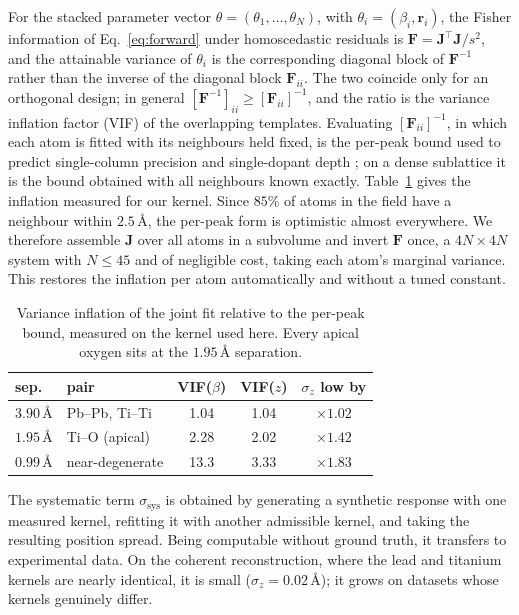 \documentclass[aps,prb,twocolumn,superscriptaddress,floatfix,nofootinbib]{revtex4-2}
\begin{document}
For the stacked parameter vector $\theta=(\theta_1,\dots,\theta_N)$, with
$\theta_i=(\beta_i,\mathbf{r}_i)$, the Fisher information of Eq.~\eqref{eq:forward} under
homoscedastic residuals is $\mathbf{F}=\mathbf{J}^{\!\top}\mathbf{J}/s^2$, and the attainable
variance of $\theta_i$ is the corresponding diagonal block of $\mathbf{F}^{-1}$ rather than the
inverse of the diagonal block $\mathbf{F}_{ii}$. The two coincide only for an orthogonal design;
in general $[\mathbf{F}^{-1}]_{ii}\ge[\mathbf{F}_{ii}]^{-1}$, and the ratio is the variance
inflation factor (VIF) of the overlapping templates. Evaluating $[\mathbf{F}_{ii}]^{-1}$, in
which each atom is fitted with its neighbours held fixed, is the per-peak bound used to predict
single-column precision \citep{DeBacker2016} and single-dopant depth \citep{Chen2021}; on a
dense sublattice it is the bound obtained with all neighbours known exactly. Table~\ref{tab:vif} gives the
inflation measured for our kernel. Since $85\%$ of atoms in the field have a neighbour within
$2.5$\,\AA, the per-peak form is optimistic almost everywhere. We therefore assemble
$\mathbf{J}$ over all atoms in a subvolume and invert $\mathbf{F}$ once, a $4N\times4N$ system
with $N\le45$ and of negligible cost, taking each atom's marginal variance. This restores the
inflation per atom automatically and without a tuned constant.

\begin{table}[t]
  \centering \small
  \begin{tabular}{@{}llccc@{}}
    \toprule
    sep. & pair & VIF($\beta$) & VIF($z$) & $\sigma_z$ low by \\
    \midrule
    $3.90$\,\AA & Pb--Pb, Ti--Ti  & \phantom{0}1.04 & 1.04 & $\times1.02$ \\
    $1.95$\,\AA & Ti--O (apical)  & \phantom{0}2.28 & 2.02 & $\times1.42$ \\
    $0.99$\,\AA & near-degenerate & 13.3 & 3.33 & $\times1.83$ \\
    \bottomrule
  \end{tabular}
  \caption{Variance inflation of the joint fit relative to the per-peak bound, measured on the
    kernel used here. Every apical oxygen sits at the $1.95$\,\AA{} separation.}
  \label{tab:vif}
\end{table}

The systematic term $\sigma_{\mathrm{sys}}$ is obtained by generating a synthetic response with
one measured kernel, refitting it with another admissible kernel, and taking the resulting
position spread. Being computable without ground truth, it transfers to experimental data. On
the coherent reconstruction, where the lead and titanium kernels are nearly identical, it is
small ($\sigma_z=0.02$\,\AA); it grows on datasets whose kernels genuinely differ.
\end{document}
